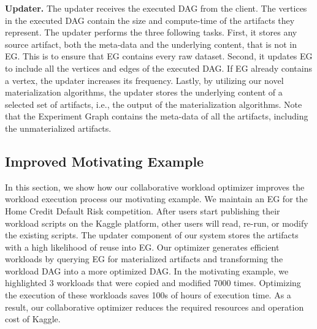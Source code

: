 \textbf{Updater.}
The updater receives the executed DAG from the client.
The vertices in the executed DAG contain the size and compute-time of the artifacts they represent.
The updater performs the three following tasks.
First, it stores any source artifact, both the meta-data and the underlying content, that is not in EG.
This is to ensure that EG contains every raw dataset.
Second, it updates EG to include all the vertices and edges of the executed DAG.
If EG already contains a vertex, the updater increases its frequency.
Lastly, by utilizing our novel materialization algorithms, the updater stores the underlying content of a selected set of artifacts, i.e., the output of the materialization algorithms.
Note that the Experiment Graph contains the meta-data of all the artifacts, including the unmaterialized artifacts.
\subsection{Improved Motivating Example}
In this section, we show how our collaborative workload optimizer improves the workload execution process our motivating example.
We maintain an EG for the Home Credit Default Risk competition.
After users start publishing their workload scripts on the Kaggle platform, other users will read, re-run, or modify the existing scripts.
The updater component of our system stores the artifacts with a high likelihood of reuse into EG.
Our optimizer generates efficient workloads by querying EG for materialized artifacts and transforming the workload DAG into a more optimized DAG.
In the motivating example, we highlighted 3 workloads that were copied and modified 7000 times.
Optimizing the execution of these workloads saves 100s of hours of execution time.
As a result, our collaborative optimizer reduces the required resources and operation cost of Kaggle.